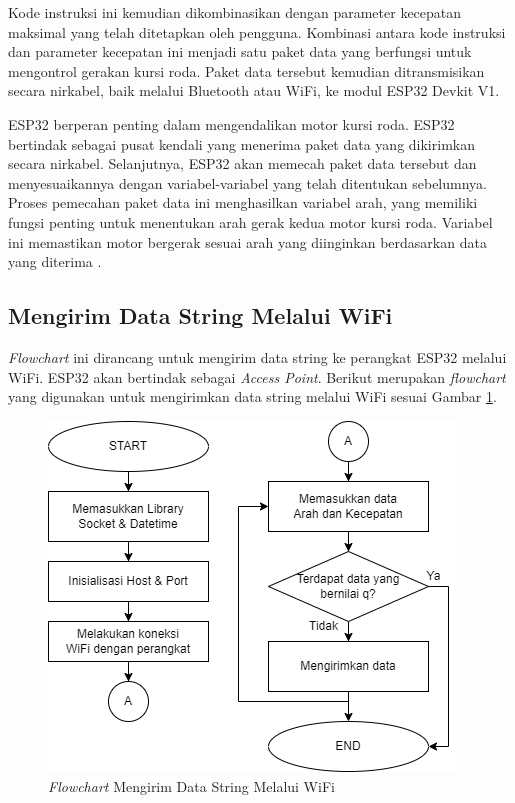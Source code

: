 Kode instruksi ini kemudian dikombinasikan dengan parameter kecepatan maksimal yang telah ditetapkan oleh pengguna. Kombinasi antara kode instruksi dan parameter kecepatan ini menjadi satu paket data yang berfungsi untuk mengontrol gerakan kursi roda. Paket data tersebut kemudian ditransmisikan secara nirkabel, baik melalui Bluetooth atau WiFi, ke modul ESP32 Devkit V1.

ESP32 berperan penting dalam mengendalikan motor kursi roda. ESP32 bertindak sebagai pusat kendali yang menerima paket data yang dikirimkan secara nirkabel. Selanjutnya, ESP32 akan memecah paket data tersebut dan menyesuaikannya dengan variabel-variabel yang telah ditentukan sebelumnya. Proses pemecahan paket data ini menghasilkan variabel arah, yang memiliki fungsi penting untuk menentukan arah gerak kedua motor kursi roda. Variabel ini memastikan motor bergerak sesuai arah yang diinginkan berdasarkan data yang diterima \parencite{ekatama2024perancangan}.

\subsection{Mengirim Data String Melalui WiFi}

\emph{Flowchart} ini dirancang untuk mengirim data string ke perangkat ESP32 melalui WiFi. ESP32 akan bertindak sebagai \emph{Access Point}. Berikut merupakan \emph{flowchart} yang digunakan untuk mengirimkan data string melalui WiFi sesuai Gambar \ref{fig:Flowchart 10 Mengirim String WiFi}.

\begin{figure} [H] \centering
  \includegraphics[scale=0.5]{gambar/bab3/10. Mengirim Data String WiFi.png}
  \caption{\emph{Flowchart} Mengirim Data String Melalui WiFi}
  \label{fig:Flowchart 10 Mengirim String WiFi}
\end{figure}

